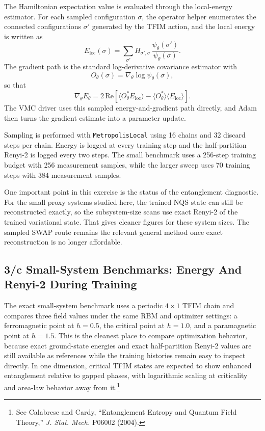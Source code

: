 \documentclass[11pt,a4paper]{article}
\begin{document}
The Hamiltonian expectation value is evaluated through the local-energy estimator. For each sampled configuration $\sigma$, the operator helper enumerates the connected configurations $\sigma'$ generated by the TFIM action, and the local energy is written as
\begin{equation}
    E_{\mathrm{loc}}(\sigma)
    =
    \sum_{\sigma'} H_{\sigma',\sigma}\,
    \frac{\psi_\theta(\sigma')}{\psi_\theta(\sigma)}.
\end{equation}
The gradient path is the standard log-derivative covariance estimator with
\begin{equation}
    O_\theta(\sigma) = \nabla_\theta \log \psi_\theta(\sigma),
\end{equation}
so that
\begin{equation}
    \nabla_\theta E_\theta
    =
    2\,\mathrm{Re}\!\left[
        \langle O_\theta^* E_{\mathrm{loc}} \rangle
        -
        \langle O_\theta^* \rangle
        \langle E_{\mathrm{loc}} \rangle
    \right].
\end{equation}
The VMC driver uses this sampled energy-and-gradient path directly, and Adam then turns the gradient estimate into a parameter update.

Sampling is performed with \texttt{MetropolisLocal} using 16 chains and 32 discard steps per chain. Energy is logged at every training step and the half-partition Renyi-2 is logged every two steps. The small benchmark uses a 256-step training budget with 256 measurement samples, while the larger sweep uses 70 training steps with 384 measurement samples.

One important point in this exercise is the status of the entanglement diagnostic. For the small proxy systems studied here, the trained NQS state can still be reconstructed exactly, so the subsystem-size scans use exact Renyi-2 of the trained variational state. That gives cleaner figures for these system sizes. The sampled SWAP route remains the relevant general method once exact reconstruction is no longer affordable.

\subsection*{3/c Small-System Benchmarks: Energy And Renyi-2 During Training}

The exact small-system benchmark uses a periodic $4\times 1$ TFIM chain and compares three field values under the same RBM and optimizer settings: a ferromagnetic point at $h = 0.5$, the critical point at $h = 1.0$, and a paramagnetic point at $h = 1.5$. This is the cleanest place to compare optimization behavior, because exact ground-state energies and exact half-partition Renyi-2 values are still available as references while the training histories remain easy to inspect directly. In one dimension, critical TFIM states are expected to show enhanced entanglement relative to gapped phases, with logarithmic scaling at criticality and area-law behavior away from it.\footnote{See Calabrese and Cardy, ``Entanglement Entropy and Quantum Field Theory,'' \emph{J. Stat. Mech.} P06002 (2004).}
\end{document}
